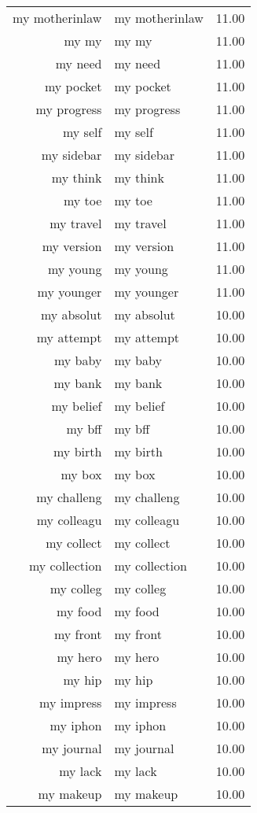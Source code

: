 \begin{table}[ht]
\begin{tabular}{rlr}
  my motherinlaw & my motherinlaw & 11.00 \\ 
  my my & my my & 11.00 \\ 
  my need & my need & 11.00 \\ 
  my pocket & my pocket & 11.00 \\ 
  my progress & my progress & 11.00 \\ 
  my self & my self & 11.00 \\ 
  my sidebar & my sidebar & 11.00 \\ 
  my think & my think & 11.00 \\ 
  my toe & my toe & 11.00 \\ 
  my travel & my travel & 11.00 \\ 
  my version & my version & 11.00 \\ 
  my young & my young & 11.00 \\ 
  my younger & my younger & 11.00 \\ 
  my absolut & my absolut & 10.00 \\ 
  my attempt & my attempt & 10.00 \\ 
  my baby & my baby & 10.00 \\ 
  my bank & my bank & 10.00 \\ 
  my belief & my belief & 10.00 \\ 
  my bff & my bff & 10.00 \\ 
  my birth & my birth & 10.00 \\ 
  my box & my box & 10.00 \\ 
  my challeng & my challeng & 10.00 \\ 
  my colleagu & my colleagu & 10.00 \\ 
  my collect & my collect & 10.00 \\ 
  my collection & my collection & 10.00 \\ 
  my colleg & my colleg & 10.00 \\ 
  my food & my food & 10.00 \\ 
  my front & my front & 10.00 \\ 
  my hero & my hero & 10.00 \\ 
  my hip & my hip & 10.00 \\ 
  my impress & my impress & 10.00 \\ 
  my iphon & my iphon & 10.00 \\ 
  my journal & my journal & 10.00 \\ 
  my lack & my lack & 10.00 \\ 
  my makeup & my makeup & 10.00 \\ 

\end{tabular}
\end{table}
